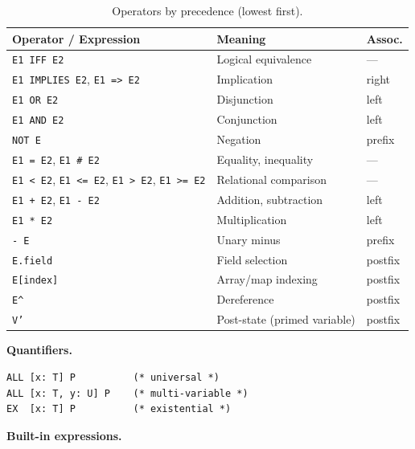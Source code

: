 \documentclass[11pt]{article}
\newcommand{\m}[1]{\texttt{#1}}
\begin{document}
\begin{table}[ht]
\centering
\begin{tabular}{@{}lll@{}}
\toprule
Operator / Expression & Meaning & Assoc. \\
\midrule
\m{E1 IFF E2} & Logical equivalence & --- \\
\m{E1 IMPLIES E2}, \m{E1 => E2} & Implication & right \\
\m{E1 OR E2} & Disjunction & left \\
\m{E1 AND E2} & Conjunction & left \\
\m{NOT E} & Negation & prefix \\
\m{E1 = E2}, \m{E1 \# E2} & Equality, inequality & --- \\
\m{E1 < E2}, \m{E1 <= E2}, \m{E1 > E2}, \m{E1 >= E2}
  & Relational comparison & --- \\
\m{E1 + E2}, \m{E1 - E2} & Addition, subtraction & left \\
\m{E1 * E2} & Multiplication & left \\
\m{- E} & Unary minus & prefix \\
\m{E.field} & Field selection & postfix \\
\m{E[index]} & Array/map indexing & postfix \\
\m{E\textasciicircum} & Dereference & postfix \\
\m{V'} & Post-state (primed variable) & postfix \\
\bottomrule
\end{tabular}
\caption{Operators by precedence (lowest first).}
\label{tab:ops}
\end{table}

\medskip\noindent\textbf{Quantifiers.}

\begin{lstlisting}[language=ESC]
ALL [x: T] P          (* universal *)
ALL [x: T, y: U] P    (* multi-variable *)
EX  [x: T] P          (* existential *)
\end{lstlisting}

\medskip\noindent\textbf{Built-in expressions.}
\end{document}
